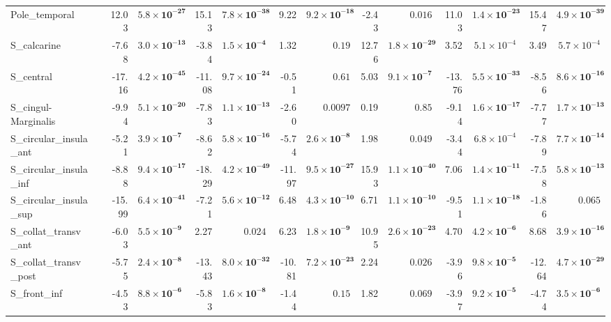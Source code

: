 {\begin{longtable}{llrrrrrrrrrrrr}
Pole\_temporal &  & 12.03 & $\mathbf{5.8{\times}10^{-27}}$ & 15.13 & $\mathbf{7.8{\times}10^{-38}}$ & 9.22 & $\mathbf{9.2{\times}10^{-18}}$ & -2.43 & $0.016$ & 11.03 & $\mathbf{1.4{\times}10^{-23}}$ & 15.47 & $\mathbf{4.9{\times}10^{-39}}$ \\
S\_calcarine &  & -7.68 & $\mathbf{3.0{\times}10^{-13}}$ & -3.84 & $\mathbf{1.5{\times}10^{-4}}$ & 1.32 & $0.19$ & 12.76 & $\mathbf{1.8{\times}10^{-29}}$ & 3.52 & $5.1{\times}10^{-4}$ & 3.49 & $5.7{\times}10^{-4}$ \\
S\_central &  & -17.16 & $\mathbf{4.2{\times}10^{-45}}$ & -11.08 & $\mathbf{9.7{\times}10^{-24}}$ & -0.51 & $0.61$ & 5.03 & $\mathbf{9.1{\times}10^{-7}}$ & -13.76 & $\mathbf{5.5{\times}10^{-33}}$ & -8.56 & $\mathbf{8.6{\times}10^{-16}}$ \\
S\_cingul-Marginalis &  & -9.94 & $\mathbf{5.1{\times}10^{-20}}$ & -7.83 & $\mathbf{1.1{\times}10^{-13}}$ & -2.60 & $0.0097$ & 0.19 & $0.85$ & -9.14 & $\mathbf{1.6{\times}10^{-17}}$ & -7.77 & $\mathbf{1.7{\times}10^{-13}}$ \\
S\_circular\_insula\_ant &  & -5.21 & $\mathbf{3.9{\times}10^{-7}}$ & -8.62 & $\mathbf{5.8{\times}10^{-16}}$ & -5.74 & $\mathbf{2.6{\times}10^{-8}}$ & 1.98 & $0.049$ & -3.44 & $6.8{\times}10^{-4}$ & -7.89 & $\mathbf{7.7{\times}10^{-14}}$ \\
S\_circular\_insula\_inf &  & -8.88 & $\mathbf{9.4{\times}10^{-17}}$ & -18.29 & $\mathbf{4.2{\times}10^{-49}}$ & -11.97 & $\mathbf{9.5{\times}10^{-27}}$ & 15.93 & $\mathbf{1.1{\times}10^{-40}}$ & 7.06 & $\mathbf{1.4{\times}10^{-11}}$ & -7.58 & $\mathbf{5.8{\times}10^{-13}}$ \\
S\_circular\_insula\_sup &  & -15.99 & $\mathbf{6.4{\times}10^{-41}}$ & -7.21 & $\mathbf{5.6{\times}10^{-12}}$ & 6.48 & $\mathbf{4.3{\times}10^{-10}}$ & 6.71 & $\mathbf{1.1{\times}10^{-10}}$ & -9.51 & $\mathbf{1.1{\times}10^{-18}}$ & -1.86 & $0.065$ \\
S\_collat\_transv\_ant &  & -6.03 & $\mathbf{5.5{\times}10^{-9}}$ & 2.27 & $0.024$ & 6.23 & $\mathbf{1.8{\times}10^{-9}}$ & 10.95 & $\mathbf{2.6{\times}10^{-23}}$ & 4.70 & $\mathbf{4.2{\times}10^{-6}}$ & 8.68 & $\mathbf{3.9{\times}10^{-16}}$ \\
S\_collat\_transv\_post &  & -5.75 & $\mathbf{2.4{\times}10^{-8}}$ & -13.43 & $\mathbf{8.0{\times}10^{-32}}$ & -10.81 & $\mathbf{7.2{\times}10^{-23}}$ & 2.24 & $0.026$ & -3.96 & $\mathbf{9.8{\times}10^{-5}}$ & -12.64 & $\mathbf{4.7{\times}10^{-29}}$ \\
S\_front\_inf &  & -4.53 & $\mathbf{8.8{\times}10^{-6}}$ & -5.83 & $\mathbf{1.6{\times}10^{-8}}$ & -1.44 & $0.15$ & 1.82 & $0.069$ & -3.97 & $\mathbf{9.2{\times}10^{-5}}$ & -4.74 & $\mathbf{3.5{\times}10^{-6}}$ \\

\end{longtable}}

